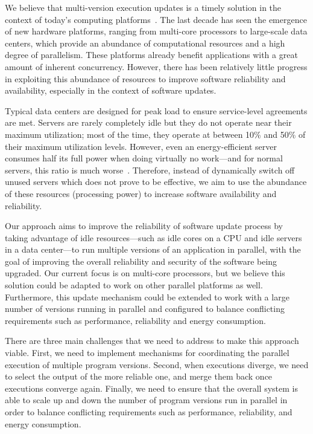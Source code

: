 We believe that multi-version execution updates is a timely solution in the
context of today's computing platforms~\cite{multiplicity}. The last decade has
seen the emergence of new hardware platforms, ranging from multi-core
processors to large-scale data centers, which provide an abundance of
computational resources and a high degree of parallelism. These platforms
already benefit applications with a great amount of inherent concurrency.
However, there has been relatively little progress in exploiting this abundance
of resources to improve software reliability and availability, especially in
the context of software updates.

Typical data centers are designed for peak load to ensure service-level
agreements are met. Servers are rarely completely idle but they do not operate
near their maximum utilization; most of the time, they operate at between 10\%
and 50\% of their maximum utilization levels. However, even an energy-efficient
server consumes half its full power when doing virtually no work---and for
normal servers, this ratio is much worse~\cite{barroso2007}.  Therefore,
instead of dynamically switch off unused servers which does not prove to be
effective, we aim to use the abundance of these resources (\ie processing
power) to increase software availability and reliability.

Our approach aims to improve the reliability of software update process by
taking advantage of idle resources---such as idle cores on a CPU and idle
servers in a data center---to run multiple versions of an application in
parallel, with the goal of improving the overall reliability and security of
the software being upgraded.  Our current focus is on multi-core processors,
but we believe this solution could be adapted to work on other parallel
platforms as well.  Furthermore, this update mechanism could be extended to
work with a large number of versions running in parallel and configured to
balance conflicting requirements such as performance, reliability and energy
consumption.

There are three main challenges that we need to address to make this approach
viable. First, we need to implement mechanisms for coordinating the parallel
execution of multiple program versions.  Second, when executions diverge, we
need to select the output of the more reliable one, and merge them back once
executions converge again.  Finally, we need to ensure that the overall system
is able to scale up and down the number of program versions run in parallel in
order to balance conflicting requirements such as performance, reliability, and
energy consumption.

